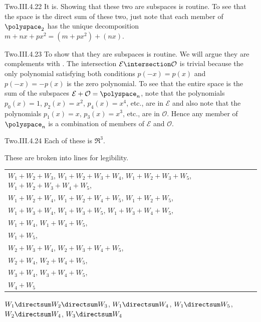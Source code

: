 \begin{ans}{Two.III.4.22}
      It is.
      Showing that these two are subspaces is routine.
      To see that the space is the direct sum of these two, just note that
      each member of \( \polyspace_2 \) has the unique decomposition
      \( m+nx+px^2=(m+px^2)+(nx) \).
     
\end{ans}
\begin{ans}{Two.III.4.23}
      To show that they are subspaces is routine.
      We will argue they are complements with .
      The intersection \( \mathcal{E}\intersection\mathcal{O} \) is trivial
      because the only polynomial satisfying both conditions $p(-x)=p(x)$ and
      $p(-x)=-p(x)$ is the zero polynomial.
      To see that the entire space is the sum of the subspaces
      \( \mathcal{E}+\mathcal{O}=\polyspace_n \),
      note that the polynomials
      \( p_0(x)=1 \), \( p_2(x)=x^2 \), \( p_4(x)=x^4 \), etc., are
      in \( \mathcal{E} \) and also note that the polynomials
      \( p_1(x)=x \), \( p_3(x)=x^3 \), etc., are in \( \mathcal{O} \).
      Hence any member of \( \polyspace_n \) is a combination of members of
      \( \mathcal{E} \) and \( \mathcal{O} \).
    
\end{ans}
\begin{ans}{Two.III.4.24}
     Each of these is $\Re^3$.
     \begin{exparts}
      \partsitem
        These are broken into lines for legibility.
        \begin{center}
          \begin{tabular}[t]{l}
            $W_1+W_2+W_3$,
              $W_1+W_2+W_3+W_4$,
              $W_1+W_2+W_3+W_5$,
              $W_1+W_2+W_3+W_4+W_5$, \\ \quad %
              $W_1+W_2+W_4$,
              $W_1+W_2+W_4+W_5$,
              $W_1+W_2+W_5$,         \\
              $W_1+W_3+W_4$,
              $W_1+W_3+W_5$,
              $W_1+W_3+W_4+W_5$,     \\
              $W_1+W_4$,
              $W_1+W_4+W_5$,         \\
              $W_1+W_5$,             \\
              $W_2+W_3+W_4$,
              $W_2+W_3+W_4+W_5$,     \\
              $W_2+W_4$,
              $W_2+W_4+W_5$,         \\
              $W_3+W_4$,
              $W_3+W_4+W_5$,         \\
              $W_4+W_5$
          \end{tabular}
         \end{center}
     \partsitem
       $W_1\directsum W_2\directsum W_3$,
       $W_1\directsum W_4$,
       $W_1\directsum W_5$,
       $W_2\directsum W_4$,
       $W_3\directsum W_4$
     \end{exparts}
    
\end{ans}
